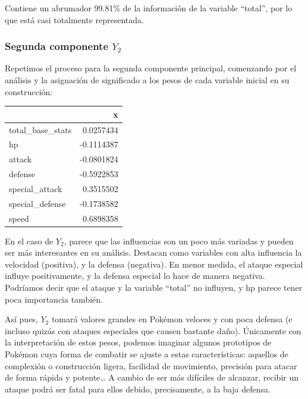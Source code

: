 \documentclass[
  12pt,
]{extreport}
\begin{document}
Contiene un abrumador 99.81\% de la información de la variable
``total'', por lo que está casi totalmente representada.

\subsubsection{\texorpdfstring{Segunda componente
\(Y_2\)}{Segunda componente Y\_2}}\label{segunda-componente-y_2}

Repetimos el proceso para la segunda componente principal, comenzando
por el análisis y la asignación de significado a los pesos de cada
variable inicial en su construcción:

\begin{table}[H]
\centering\begingroup\fontsize{10.5}{12.5}\selectfont

\begin{tabular}{lr}
\toprule
  & x\\
\midrule
total\_base\_stats & 0.0257434\\
hp & -0.1114387\\
attack & -0.0801824\\
defense & -0.5922853\\
special\_attack & 0.3515502\\
\addlinespace
special\_defense & -0.1738582\\
speed & 0.6898358\\
\bottomrule
\end{tabular}
\endgroup{}
\end{table}

En el caso de \(Y_2\), parece que las influencias son un poco más
variadas y pueden ser más interesantes en su análisis. Destacan como
variables con alta influencia la velocidad (positiva), y la defensa
(negativa). En menor medida, el ataque especial influye positivamente, y
la defensa especial lo hace de manera negativa. Podríamos decir que el
ataque y la variable ``total'' no influyen, y hp parece tener poca
importancia también.

Así pues, \(Y_2\) tomará valores grandes en Pokémon veloces y con poca
defensa (e incluso quizás con ataques especiales que causen bastante
daño). Únicamente con la interpretación de estos pesos, podemos imaginar
algunos prototipos de Pokémon cuya forma de combatir se ajuste a estas
características: aquellos de complexión o construcción ligera, facilidad
de movimiento, precisión para atacar de forma rápida y potente\ldots{} A
cambio de ser más difíciles de alcanzar, recibir un ataque podrá ser
fatal para ellos debido, precisamente, a la baja defensa.
\end{document}
